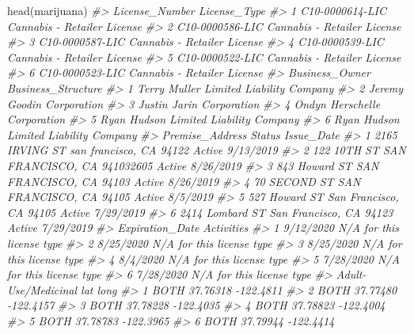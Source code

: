 \documentclass[
]{krantz}
\makeatletter
\newenvironment{Shaded}{\begin{snugshade}}{\end{snugshade}}
\newcommand{\CommentTok}[1]{\textcolor[rgb]{0.37,0.37,0.37}{\textit{#1}}}
\newcommand{\FunctionTok}[1]{\textcolor[rgb]{0,0,0}{#1}}
\newcommand{\NormalTok}[1]{#1}
\newenvironment{kframe}{%
\medskip{}
\setlength{\fboxsep}{.8em}
 \def\at@end@of@kframe{}%
 \ifinner\ifhmode%
  \def\at@end@of@kframe{\end{minipage}}%
  \begin{minipage}{\columnwidth}%
 \fi\fi%
 \def\FrameCommand##1{\hskip\@totalleftmargin \hskip-\fboxsep
 \colorbox{shadecolor}{##1}\hskip-\fboxsep
     \hskip-\linewidth \hskip-\@totalleftmargin \hskip\columnwidth}%
 \MakeFramed {\advance\hsize-\width
   \@totalleftmargin\z@ \linewidth\hsize
   \@setminipage}}%
 {\par\unskip\endMakeFramed%
 \at@end@of@kframe}
\renewenvironment{Shaded}{\begin{kframe}}{\end{kframe}}
\makeatother
\begin{document}
\begin{Shaded}
\begin{Highlighting}[]
\FunctionTok{head}\NormalTok{(marijuana)}
\CommentTok{\#\textgreater{}    License\_Number                License\_Type}
\CommentTok{\#\textgreater{} 1 C10{-}0000614{-}LIC Cannabis {-} Retailer License}
\CommentTok{\#\textgreater{} 2 C10{-}0000586{-}LIC Cannabis {-} Retailer License}
\CommentTok{\#\textgreater{} 3 C10{-}0000587{-}LIC Cannabis {-} Retailer License}
\CommentTok{\#\textgreater{} 4 C10{-}0000539{-}LIC Cannabis {-} Retailer License}
\CommentTok{\#\textgreater{} 5 C10{-}0000522{-}LIC Cannabis {-} Retailer License}
\CommentTok{\#\textgreater{} 6 C10{-}0000523{-}LIC Cannabis {-} Retailer License}
\CommentTok{\#\textgreater{}     Business\_Owner        Business\_Structure}
\CommentTok{\#\textgreater{} 1     Terry Muller Limited Liability Company}
\CommentTok{\#\textgreater{} 2    Jeremy Goodin               Corporation}
\CommentTok{\#\textgreater{} 3     Justin Jarin               Corporation}
\CommentTok{\#\textgreater{} 4 Ondyn Herschelle               Corporation}
\CommentTok{\#\textgreater{} 5      Ryan Hudson Limited Liability Company}
\CommentTok{\#\textgreater{} 6      Ryan Hudson Limited Liability Company}
\CommentTok{\#\textgreater{}                           Premise\_Address Status Issue\_Date}
\CommentTok{\#\textgreater{} 1  2165 IRVING ST san francisco, CA 94122 Active  9/13/2019}
\CommentTok{\#\textgreater{} 2 122 10TH ST SAN FRANCISCO, CA 941032605 Active  8/26/2019}
\CommentTok{\#\textgreater{} 3   843 Howard ST SAN FRANCISCO, CA 94103 Active  8/26/2019}
\CommentTok{\#\textgreater{} 4    70 SECOND ST SAN FRANCISCO, CA 94105 Active   8/5/2019}
\CommentTok{\#\textgreater{} 5   527 Howard ST San Francisco, CA 94105 Active  7/29/2019}
\CommentTok{\#\textgreater{} 6 2414 Lombard ST San Francisco, CA 94123 Active  7/29/2019}
\CommentTok{\#\textgreater{}   Expiration\_Date                Activities}
\CommentTok{\#\textgreater{} 1       9/12/2020 N/A for this license type}
\CommentTok{\#\textgreater{} 2       8/25/2020 N/A for this license type}
\CommentTok{\#\textgreater{} 3       8/25/2020 N/A for this license type}
\CommentTok{\#\textgreater{} 4        8/4/2020 N/A for this license type}
\CommentTok{\#\textgreater{} 5       7/28/2020 N/A for this license type}
\CommentTok{\#\textgreater{} 6       7/28/2020 N/A for this license type}
\CommentTok{\#\textgreater{}   Adult{-}Use/Medicinal      lat      long}
\CommentTok{\#\textgreater{} 1                BOTH 37.76318 {-}122.4811}
\CommentTok{\#\textgreater{} 2                BOTH 37.77480 {-}122.4157}
\CommentTok{\#\textgreater{} 3                BOTH 37.78228 {-}122.4035}
\CommentTok{\#\textgreater{} 4                BOTH 37.78823 {-}122.4004}
\CommentTok{\#\textgreater{} 5                BOTH 37.78783 {-}122.3965}
\CommentTok{\#\textgreater{} 6                BOTH 37.79944 {-}122.4414}
\end{Highlighting}
\end{Shaded}
\end{document}
